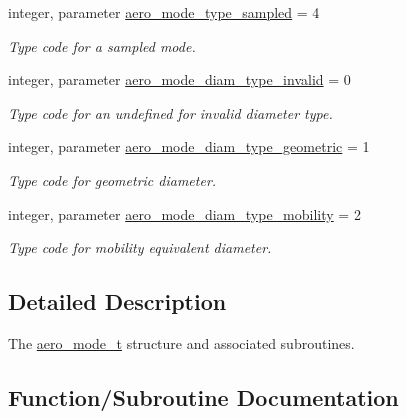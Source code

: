 \begin{DoxyCompactItemize}
integer, parameter \mbox{\hyperlink{namespacepmc__aero__mode_a86073e0512631b231222d9442877828b}{aero\+\_\+mode\+\_\+type\+\_\+sampled}} = 4
\begin{DoxyCompactList}\small\item\em Type code for a sampled mode. \end{DoxyCompactList}\item 
integer, parameter \mbox{\hyperlink{namespacepmc__aero__mode_a077d0096a03191f4143833e2ae2282cf}{aero\+\_\+mode\+\_\+diam\+\_\+type\+\_\+invalid}} = 0
\begin{DoxyCompactList}\small\item\em Type code for an undefined for invalid diameter type. \end{DoxyCompactList}\item 
integer, parameter \mbox{\hyperlink{namespacepmc__aero__mode_ac8c82b18cfaa8e5b9725d7e891f57ed7}{aero\+\_\+mode\+\_\+diam\+\_\+type\+\_\+geometric}} = 1
\begin{DoxyCompactList}\small\item\em Type code for geometric diameter. \end{DoxyCompactList}\item 
integer, parameter \mbox{\hyperlink{namespacepmc__aero__mode_add8ce2fd804c423ed56bee1f62273804}{aero\+\_\+mode\+\_\+diam\+\_\+type\+\_\+mobility}} = 2
\begin{DoxyCompactList}\small\item\em Type code for mobility equivalent diameter. \end{DoxyCompactList}\end{DoxyCompactItemize}


\subsection{Detailed Description}
The \mbox{\hyperlink{structpmc__aero__mode_1_1aero__mode__t}{aero\+\_\+mode\+\_\+t}} structure and associated subroutines. 

\subsection{Function/\+Subroutine Documentation}
\mbox{\label{namespacepmc__aero__mode_ab66d248f61d08547c4acd818f6a57dc2}} 
